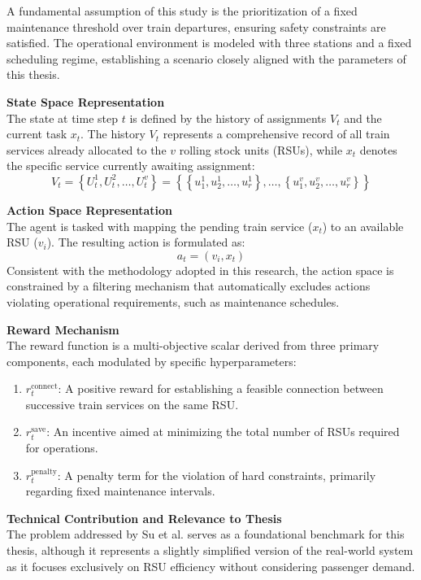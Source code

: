 \documentclass[a4paper]{scrartcl}
\begin{document}
A fundamental assumption of this study is the prioritization of a fixed maintenance threshold over train departures, ensuring safety constraints are satisfied. The operational environment is modeled with three stations and a fixed scheduling regime, establishing a scenario closely aligned with the parameters of this thesis.

\textbf{State Space Representation} \\
The state at time step $t$ is defined by the history of assignments $V_t$ and the current task $x_t$. The history $V_t$ represents a comprehensive record of all train services already allocated to the $v$ rolling stock units (RSUs), while $x_t$ denotes the specific service currently awaiting assignment:
$$
V_t = \left\{ U_t^1 , U_t^2 , \ldots , U_t^v \right\} = \left\{ \left\{u_1^1 , u_2^1 , \ldots , u_r^1\right\} , \ldots , \left\{u_1^v , u_2^v , \ldots , u_r^v\right\} \right\}
$$

\textbf{Action Space Representation} \\
The agent is tasked with mapping the pending train service ($x_t$) to an available RSU ($v_i$). The resulting action is formulated as:
$$
a_t = (v_i, x_t)
$$
Consistent with the methodology adopted in this research, the action space is constrained by a filtering mechanism that automatically excludes actions violating operational requirements, such as maintenance schedules.

\textbf{Reward Mechanism} \\
The reward function is a multi-objective scalar derived from three primary components, each modulated by specific hyperparameters:
\begin{enumerate}
    \item $r_t^\text{connect}$: A positive reward for establishing a feasible connection between successive train services on the same RSU.
    \item $r_t^\text{save}$: An incentive aimed at minimizing the total number of RSUs required for operations.
    \item $r_t^\text{penalty}$: A penalty term for the violation of hard constraints, primarily regarding fixed maintenance intervals.
\end{enumerate}

\textbf{Technical Contribution and Relevance to Thesis} \\
The problem addressed by Su et al. \cite{SU2026} serves as a foundational benchmark for this thesis, although it represents a slightly simplified version of the real-world system as it focuses exclusively on RSU efficiency without considering passenger demand. 
\end{document}
